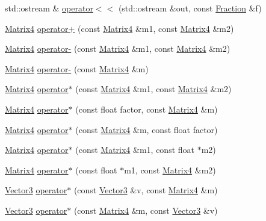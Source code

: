 \begin{DoxyCompactItemize}
\item 
std\+::ostream \& \hyperlink{namespaceprism_a9c2d182a77a92e6cba7917dbd58f9d87}{operator$<$$<$} (std\+::ostream \&out, const \hyperlink{classprism_1_1_fraction}{Fraction} \&f)
\item 
\hyperlink{classprism_1_1_matrix4}{Matrix4} \hyperlink{namespaceprism_a33537d30f01f996f8a05fc5b1b49ba3b}{operator+} (const \hyperlink{classprism_1_1_matrix4}{Matrix4} \&m1, const \hyperlink{classprism_1_1_matrix4}{Matrix4} \&m2)
\item 
\hyperlink{classprism_1_1_matrix4}{Matrix4} \hyperlink{namespaceprism_a34a2f64f209065f753bed62a880b75b6}{operator-\/} (const \hyperlink{classprism_1_1_matrix4}{Matrix4} \&m1, const \hyperlink{classprism_1_1_matrix4}{Matrix4} \&m2)
\item 
\hyperlink{classprism_1_1_matrix4}{Matrix4} \hyperlink{namespaceprism_a879d3410d690b5722a9af17297f38fbb}{operator-\/} (const \hyperlink{classprism_1_1_matrix4}{Matrix4} \&m)
\item 
\hyperlink{classprism_1_1_matrix4}{Matrix4} \hyperlink{namespaceprism_a9ae44fb46bb709a5c8f4d592baf65522}{operator$\ast$} (const \hyperlink{classprism_1_1_matrix4}{Matrix4} \&m1, const \hyperlink{classprism_1_1_matrix4}{Matrix4} \&m2)
\item 
\hyperlink{classprism_1_1_matrix4}{Matrix4} \hyperlink{namespaceprism_ab3639f7bd46a54726522dfe406841ea9}{operator$\ast$} (const float factor, const \hyperlink{classprism_1_1_matrix4}{Matrix4} \&m)
\item 
\hyperlink{classprism_1_1_matrix4}{Matrix4} \hyperlink{namespaceprism_a4073983f089695c40b6fd20d892175f9}{operator$\ast$} (const \hyperlink{classprism_1_1_matrix4}{Matrix4} \&m, const float factor)
\item 
\hyperlink{classprism_1_1_matrix4}{Matrix4} \hyperlink{namespaceprism_aa2859acb8e8dd6fea8678e14249e561d}{operator$\ast$} (const \hyperlink{classprism_1_1_matrix4}{Matrix4} \&m1, const float $\ast$m2)
\item 
\hyperlink{classprism_1_1_matrix4}{Matrix4} \hyperlink{namespaceprism_a5e83bcd69595728106bed838aeb32f70}{operator$\ast$} (const float $\ast$m1, const \hyperlink{classprism_1_1_matrix4}{Matrix4} \&m2)
\item 
\hyperlink{classprism_1_1_vector3}{Vector3} \hyperlink{namespaceprism_a95ceb3342a808c88d0bb7c1f7e0ef82b}{operator$\ast$} (const \hyperlink{classprism_1_1_vector3}{Vector3} \&v, const \hyperlink{classprism_1_1_matrix4}{Matrix4} \&m)
\item 
\hyperlink{classprism_1_1_vector3}{Vector3} \hyperlink{namespaceprism_a04f1e6e0f84169fce23b236e0312d6a0}{operator$\ast$} (const \hyperlink{classprism_1_1_matrix4}{Matrix4} \&m, const \hyperlink{classprism_1_1_vector3}{Vector3} \&v)

\end{DoxyCompactItemize}
